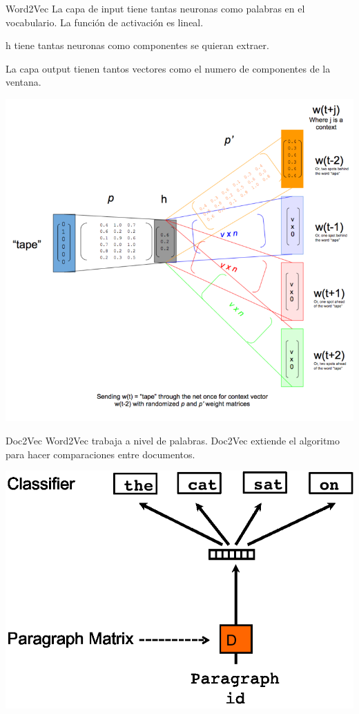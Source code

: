 \documentclass{beamer}
\begin{document}
  \begin{frame}{Word2Vec}
      La capa de input tiene tantas neuronas como palabras en el vocabulario. La función de activación es lineal.

      h tiene tantas neuronas como componentes se quieran extraer.

      La capa output tienen tantos vectores como el numero de componentes de la ventana.

      \centering
      \includegraphics[scale=0.50]{./figures/skip-gram-exp.png}
  \end{frame}
  \begin{frame}{Doc2Vec}
      Word2Vec trabaja a nivel de palabras. Doc2Vec extiende el algoritmo para hacer comparaciones entre documentos.

      \centering
      \includegraphics[scale=0.50]{./figures/distributed_bag_of_words.pdf}
  \end{frame}
\end{document}
